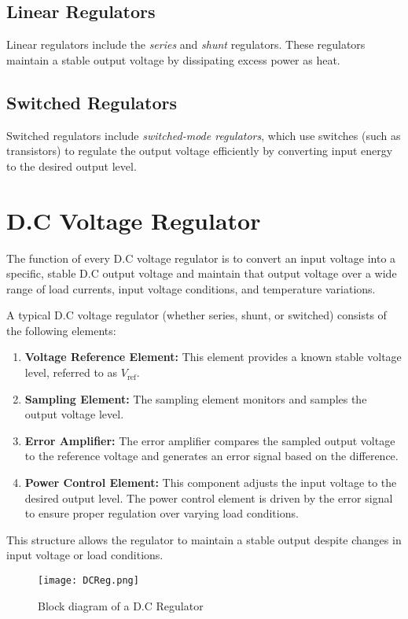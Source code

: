 \documentclass[a4paper,9pt,twoside,openany,twocolumn]{memoir}
\begin{document}
\subsection{Linear Regulators}

Linear regulators include the \textit{series} and \textit{shunt} regulators. These regulators maintain a stable output voltage by dissipating excess power as heat.

\subsection{Switched Regulators}

Switched regulators include \textit{switched-mode regulators}, which use switches (such as transistors) to regulate the output voltage efficiently by converting input energy to the desired output level.

\section{D.C Voltage Regulator}

The function of every D.C voltage regulator is to convert an input voltage into a specific, stable D.C output voltage and maintain that output voltage over a wide range of load currents, input voltage conditions, and temperature variations.

A typical D.C voltage regulator (whether series, shunt, or switched) consists of the following elements:

\begin{enumerate}
    \item \textbf{Voltage Reference Element:} This element provides a known stable voltage level, referred to as $V_{\text{ref}}$.
    \item \textbf{Sampling Element:} The sampling element monitors and samples the output voltage level.
    \item \textbf{Error Amplifier:} The error amplifier compares the sampled output voltage to the reference voltage and generates an error signal based on the difference.
    \item \textbf{Power Control Element:} This component adjusts the input voltage to the desired output level. The power control element is driven by the error signal to ensure proper regulation over varying load conditions.
\end{enumerate}

This structure allows the regulator to maintain a stable output despite changes in input voltage or load conditions.
\begin{figure}[H]
    \centering
    \texttt{[image: DCReg.png]}
    \caption{Block diagram of a D.C Regulator}
    \label{fig:DCReg}
\end{figure}
\end{document}
